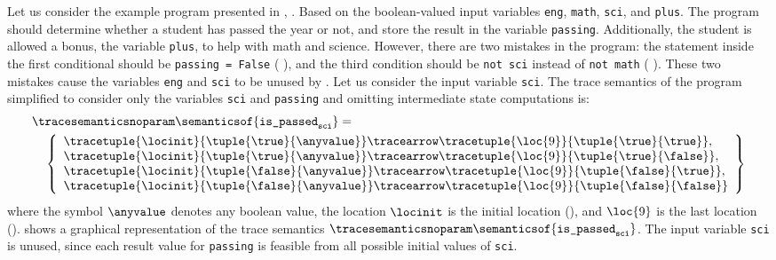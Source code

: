 \begin{example}
Let us consider the example program presented in \textcite{Urban2018}, \cf{} .
Based on the boolean-valued input variables \texttt{eng}, \texttt{math}, \texttt{sci}, and \texttt{plus}.
The program should determine whether a student has passed the year or not, and store the result in the variable \texttt{passing}. Additionally, the student is allowed a bonus, \cf{} the variable \texttt{plus}, to help with math and science.
However, there are two mistakes in the program: the statement inside the first conditional should be \texttt{passing = False} (\cf{} ), and the third condition should be \texttt{not sci} instead of \texttt{not math} (\cf{} ).
These two mistakes cause the variables \texttt{eng} and \texttt{sci} to be unused by .
Let us consider the input variable \texttt{sci}.
The trace semantics of the program simplified to consider only the variables \texttt{sci} and \texttt{passing} and omitting intermediate state computations is:
\begin{align*}
  &{\tracesemanticsnoparam\semanticsof{\texttt{is\_passed}_\texttt{sci}}
  =}\\
  &\quad\left\{
    \begin{array}{l}
      \tracetuple{\locinit}{\tuple{\true}{\anyvalue}}\tracearrow\tracetuple{\loc{9}}{\tuple{\true}{\true}}, \\
      \tracetuple{\locinit}{\tuple{\true}{\anyvalue}}\tracearrow\tracetuple{\loc{9}}{\tuple{\true}{\false}}, \\
      \tracetuple{\locinit}{\tuple{\false}{\anyvalue}}\tracearrow\tracetuple{\loc{9}}{\tuple{\false}{\true}}, \\
      \tracetuple{\locinit}{\tuple{\false}{\anyvalue}}\tracearrow\tracetuple{\loc{9}}{\tuple{\false}{\false}}
    \end{array}
  \right\}
\end{align*}
where the symbol $\anyvalue$ denotes any boolean value, the location $\locinit$ is the initial location (), and $\loc{9}$ is the last location ().
 shows a graphical representation of the trace semantics $\tracesemanticsnoparam\semanticsof{\texttt{is\_passed}_\texttt{sci}}$.
The input variable \texttt{sci} is unused, since each result value for \texttt{passing} is feasible from all possible initial values of \texttt{sci}.


\end{example}
